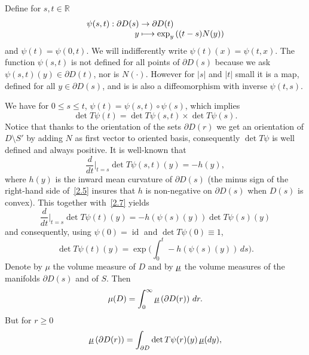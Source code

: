 \documentclass[JEP,XML,SOM,Unicode,NoFloatCountersInSection,published]{cedram}
\let\backslash\setminus
\newcommand\mto{\mathchoice{\longmapsto}{\mapsto}{\mapsto}{\mapsto}}
\theoremstyle{plain}
\theoremstyle{definition}
\newcommand{\RR}{{\mathbb R}}
\newcommand{\usm}{{\underline{\smash{\mu}}}}
\DeclareMathOperator{\id}{id}
\let\f\frac
\let\pa\partial
\begin{document}
Define for $s, t\in \RR$\vspace*{-3pt}
\begin{equation}
\label{2.4}
\begin{split}
\psi(s,t): \partial D(s)&\to \partial D(t)\\[-3pt]
y&\mto \exp_y\left((t-s)N(y)\right)
\end{split}
\end{equation}
and $\psi(t)=\psi(0,t)$. We will indifferently write $\psi(t)(x)=\psi(t,x)$.
The function $\psi(s,t)$ is not defined for all points of $\partial D(s)$ because we ask $\psi(s,t)(y)\in \partial D(t)$,
nor is $N(\cdot)$. However for $|s|$ and $|t|$ small it is a map, defined for all $y\in\partial D(s)$, and is is also a diffeomorphism with inverse $\psi(t,s)$.

We have for $0\le s\le t$,
$
\psi(t)=\psi(s,t)\circ\psi(s)$, which implies \begin{equation}\label{2.7}\det T\psi(t)=\det T\psi(s,t)\times \det T\psi(s).\end{equation}
Notice that thanks to the orientation of the sets $\partial D(r)$ we get an orientation of $D\backslash S'$ by adding $N$ as first vector to oriented basis, consequently $\det T\psi$ is well defined and always positive.
{It is well-known} that
\begin{equation}
\label{2.5}
\f{d}{dt}\Big|_{t=s}\det T\psi(s,t)(y)=-h(y),
\end{equation}
where $h(y)$ is the inward mean curvature of $\partial D(s)$
(the minus sign of the right-hand side of~\eqref{2.5} insures that $h$ is non-negative on $\pa D(s)$ when $D(s)$ is convex). This together with~\eqref{2.7} yields
\begin{equation}
\f{d}{dt}{\Big|_{t=s}}\det T\psi(t)(y)=-h\left(\psi(s)(y)\right)\det T\psi(s)(y)
\end{equation}
and consequently, using $\psi(0)=\id$ and $\det T\psi(0)\equiv 1$,
\begin{equation}
\det T\psi(t)(y)=\exp\biggl(\int_0^t -h\left(\psi(s)(y)\right)\,ds\biggr).
\end{equation}
Denote by $\mu$ the volume measure of $D$ and by $\usm$ the volume measures of the manifolds $\partial D(s)$ and of $S$.
Then
\begin{equation}
\label{2.9}
\mu(D)=\int_0^\infty \usm\left(\partial D(r)\right)\, dr.
\end{equation}
But for $r\ge 0$
\begin{equation}
\usm\left(\partial D(r)\right)=\int_{\partial D}\det T\psi(r)(y)\,\usm(dy),
\end{equation}
\end{document}
